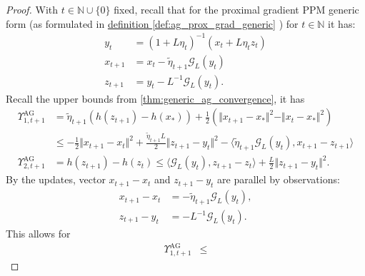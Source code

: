 \documentclass[12pt]{article}
\begin{document}
        \begin{proof}
            With $t \in \mathbb N \cup \{0\}$ fixed, 
            recall that for the proximal gradient PPM generic form 
            (as formulated in 
            \hyperref[def:ag_prox_grad_generic]{definition \ref*{def:ag_prox_grad_generic}}
            ) for $t\in \mathbb N$ it has: 
            \begin{align*}
                y_t &= (1 + L\eta_t)^{-1}(x_t + L\eta_t z_t)
                \\
                x_{t + 1} &= x_t - \tilde \eta_{t + 1} \mathcal G_L(y_t)
                \\
                z_{t + 1} &= y_t - L^{-1}\mathcal G_L(y_t). 
            \end{align*}
            Recall the upper bounds from 
            \ref*{thm:generic_ag_convergence}, 
            it has 
            \begin{align*}
                \Upsilon_{1, t + 1}^\text{AG}
                &= 
                \tilde\eta_{t + 1} (h(z_{t + 1}) - h(x_*)) + 
                \frac{1}{2} (
                    \Vert x_{t + 1} - x_*\Vert^2
                    - 
                    \Vert x_t - x_*\Vert^2
                )
                \\
                &\le 
                - \frac{1}{2}\Vert x_{t + 1} - x_t\Vert^2 
                + \frac{\tilde\eta_{t + 1}L}{2}\Vert z_{t + 1} - y_t\Vert^2
                - \langle 
                    \tilde\eta_{t + 1} \mathcal G_L(y_t), 
                    x_{t + 1} - z_{t + 1}
                \rangle
                \\
                \Upsilon_{2, t + 1}^\text{AG}
                &= 
                h(z_{t + 1}) - h(z_t) 
                \le 
                \langle \mathcal G_L(y_t), z_{t + 1} - z_t\rangle + 
                \frac{L}{2}\Vert z_{t + 1} - y_t\Vert^2. 
            \end{align*}
            By the updates, vector $x_{t + 1} - x_t$ and $z_{t + 1} - y_t$ are parallel by observations: 
            \begin{align*}
                x_{t + 1} - x_t &= -\tilde\eta_{t + 1}\mathcal G_L(y_t), 
                \\
                z_{t + 1} - y_t &= -L^{-1}\mathcal G_L(y_t). 
            \end{align*}
            This allows for 
            \begin{align*}
                \Upsilon_{1, t + 1}^{\text{AG}} 
                &\le 

\end{align*}
\end{proof}
\end{document}
